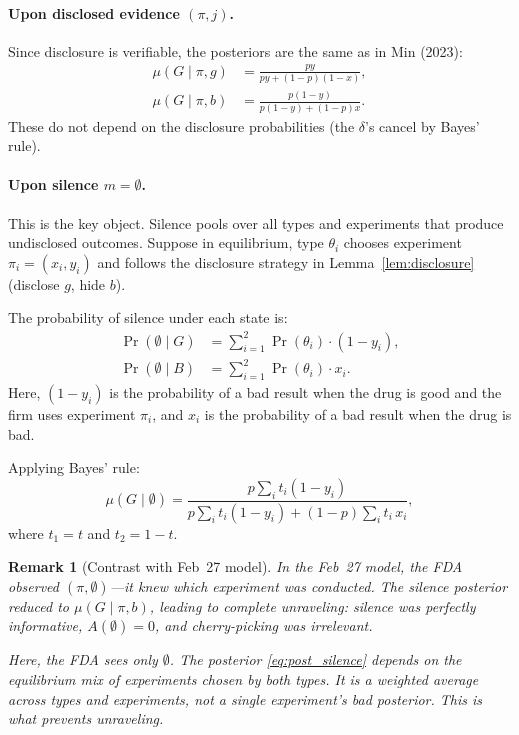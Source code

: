 \documentclass[12pt,a4paper]{article}
\newtheorem{remark}{Remark}
\begin{document}
\paragraph{Upon disclosed evidence $(\pi, j)$.}
Since disclosure is verifiable, the posteriors are the same as
in Min (2023):
\begin{align}
  \mu(G \mid \pi, g)
    &= \frac{py}{py + (1-p)(1-x)},
    \label{eq:post_g} \\
  \mu(G \mid \pi, b)
    &= \frac{p(1-y)}{p(1-y) + (1-p)x}.
    \label{eq:post_b}
\end{align}
These do not depend on the disclosure probabilities (the
$\delta$'s cancel by Bayes' rule).

\paragraph{Upon silence $m = \emptyset$.}
This is the key object. Silence pools over all types and
experiments that produce undisclosed outcomes. Suppose in
equilibrium, type $\theta_i$ chooses experiment
$\pi_i = (x_i, y_i)$ and follows the disclosure strategy in
Lemma~\ref{lem:disclosure} (disclose $g$, hide $b$).

The probability of silence under each state is:
\begin{align}
  \Pr(\emptyset \mid G)
    &= \sum_{i=1}^{2} \Pr(\theta_i) \cdot (1 - y_i),
    \label{eq:silence_G} \\
  \Pr(\emptyset \mid B)
    &= \sum_{i=1}^{2} \Pr(\theta_i) \cdot x_i.
    \label{eq:silence_B}
\end{align}
Here, $(1 - y_i)$ is the probability of a bad result when the
drug is good and the firm uses experiment $\pi_i$, and $x_i$ is
the probability of a bad result when the drug is bad.

Applying Bayes' rule:
\begin{equation}\label{eq:post_silence}
\boxed{
  \mu(G \mid \emptyset)
  = \frac{p \sum_{i} t_i (1 - y_i)}
         {p \sum_{i} t_i (1 - y_i)
          + (1-p) \sum_{i} t_i \, x_i},
}
\end{equation}
where $t_1 = t$ and $t_2 = 1 - t$.

\begin{remark}[Contrast with Feb~27 model]
In the Feb~27 model, the FDA observed $(\pi, \emptyset)$---it
knew which experiment was conducted. The silence posterior
reduced to $\mu(G \mid \pi, b)$, leading to complete
unraveling: silence was perfectly informative, $A(\emptyset) = 0$,
and cherry-picking was irrelevant.

Here, the FDA sees only $\emptyset$. The posterior
\eqref{eq:post_silence} depends on the \emph{equilibrium mix}
of experiments chosen by both types. It is a weighted average
across types and experiments, not a single experiment's bad
posterior. This is what prevents unraveling.
\end{remark}
\end{document}
